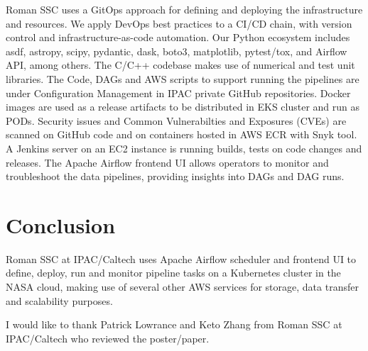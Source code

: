 \documentclass[11pt,twoside]{article}
\begin{document}
Roman SSC uses a GitOps approach for defining and deploying the infrastructure and resources. We apply DevOps best practices to a CI/CD chain, with version control and infrastructure-as-code automation. Our Python ecosystem includes asdf, astropy, scipy, pydantic, dask, boto3, matplotlib, pytest/tox, and Airflow API, among others. The C/C++ codebase makes use of numerical and test unit libraries.
The Code, DAGs and AWS scripts to support running the pipelines are under Configuration Management in IPAC private GitHub repositories.
Docker images are used as a release artifacts to be distributed in EKS cluster and run as PODs.
Security issues and Common Vulnerabilties and Exposures (CVEs) are scanned on GitHub code and on containers hosted in AWS ECR with Snyk tool.
A Jenkins server on an EC2 instance is running builds, tests on code changes and releases.
The Apache Airflow frontend UI allows operators to monitor and troubleshoot the data pipelines, providing insights into DAGs and DAG runs.


\section{Conclusion}

Roman SSC at IPAC/Caltech uses Apache Airflow scheduler and frontend UI to define, deploy, run and monitor pipeline tasks on a Kubernetes cluster in the NASA cloud, making use of several other AWS services for storage, data transfer and scalability purposes.


\acknowledgements I would like to thank Patrick Lowrance and Keto Zhang from Roman SSC at IPAC/Caltech who reviewed the poster/paper.


\end{document}
